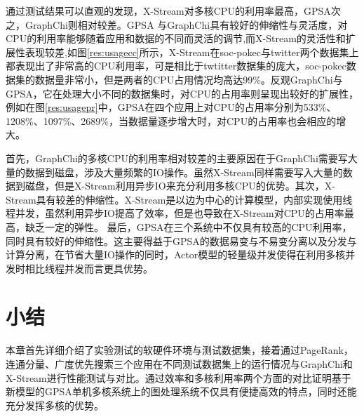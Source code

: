 通过测试结果可以直观的发现，X-Stream对多核CPU的利用率最高，GPSA次之，GraphChi则相对较差。GPSA
与GraphChi具有较好的伸缩性与灵活度，对CPU的利用率能够随着应用和数据的不同而灵活的调节,而X-Stream的灵活性和扩展性表现较差,如图\ref{res:usagecc}所示，X-Stream在soc-pokec与twitter两个数据集上都表现出了非常高的CPU利用率，可是相比于twtitter数据集的庞大，soc-pokec数据集的数据量非常小，但是两者的CPU占用情况均高达99\%。反观GraphChi与GPSA，它在处理大小不同的数据集时，对CPU的占用率则呈现出较好的扩展性，例如在图\ref{res:usagepr}中，GPSA在四个应用上对CPU的占用率分别为533\%、1208\%、1097\%、2689\%，当数据量逐步增大时，对CPU的占用率也会相应的增大。

首先，GraphChi的多核CPU的利用率相对较差的主要原因在于GraphChi需要写大量的数据到磁盘，涉及大量频繁的IO操作。虽然X-Stream同样需要写入大量的数据到磁盘，但是X-Stream利用异步IO来充分利用多核CPU的优势。其次，X-Stream具有较差的伸缩性。X-Stream是以边为中心的计算模型，内部实现使用线程并发，虽然利用异步IO提高了效率，但是也导致在X-Stream对CPU的占用率最高，缺乏一定的弹性。
最后，GPSA在三个系统中不仅具有较高的CPU利用率，同时具有较好的伸缩性。这主要得益于GPSA的数据易变与不易变分离以及分发与计算分离，在节省大量IO操作的同时，Actor模型的轻量级并发使得在利用多核并发时相比线程并发而言更具优势。







\section{小结}

本章首先详细介绍了实验测试的软硬件环境与测试数据集，接着通过PageRank，连通分量、广度优先搜索三个应用在不同测试数据集上的运行情况与GraphChi和X-Stream进行性能测试与对比。通过效率和多核利用率两个方面的对比证明基于新模型的GPSA单机多核系统上的图处理系统不仅具有便捷高效的特点，同时还能充分发挥多核的优势。





